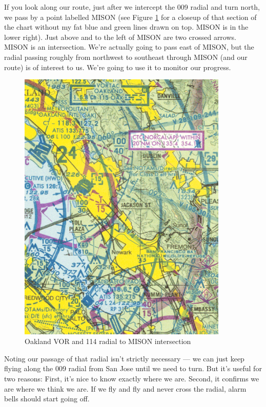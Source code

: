 If you look along our route, just after we intercept the 009 radial
and turn north, we pass by a point labelled MISON (see Figure
\ref{fig:Oakland} for a closeup of that section of the chart without
my fat blue and green lines drawn on top.  MISON is in the lower
right).  Just above and to the left of MISON are two crossed arrows.
MISON is an intersection.  We're actually going to pass east of MISON,
but the radial passing roughly from northwest to southeast through
MISON (and our route) is of interest to us.  We're going to use it to
monitor our progress.

\begin{figure}
  \begin{center}
    \includegraphics[width=10cm]{img/Oakland}
    \caption{Oakland VOR and 114 radial to MISON intersection}
    \label{fig:Oakland}
  \end{center}
\end{figure}

Noting our passage of that radial isn't strictly necessary --- we can
just keep flying along the 009 radial from San Jose until we need to
turn.  But it's useful for two reasons: First, it's nice to know
exactly where we are.  Second, it confirms we are where we think we
are.  If we fly and fly and never cross the radial, alarm bells should
start going off.


